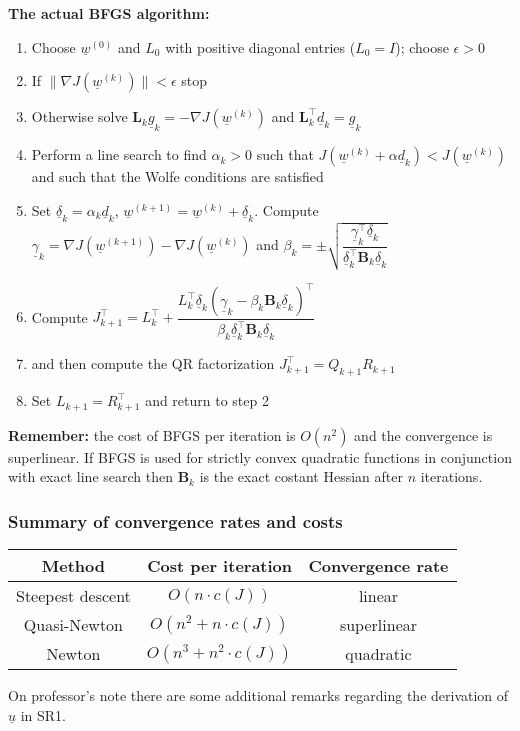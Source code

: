 \textbf{The actual BFGS algorithm:}
\begin{enumerate}
    \item Choose $\underline{w}^{(0)}$ and $L_0$ with positive diagonal entries ($L_0 = I$); choose $\epsilon > 0$
    \item If $\|\nabla J(\underline{w}^{(k)})\| < \epsilon$ stop
    \item Otherwise solve $\mathbf{L}_k \underline{g}_k = - \nabla J(\underline{w}^{(k)})$ and $\mathbf{L}_k^\intercal \underline{d}_k = \underline{g}_k$
    \item Perform a line search to find $\alpha_k > 0$ such that $J(\underline{w}^{(k)} +  \alpha\underline{d}_k) < J(\underline{w}^{(k)})$ and such that the Wolfe conditions are satisfied
    \item Set $\underline{\delta}_k = \alpha_k \underline{d}_k$, $\underline{w}^{(k+1)} = \underline{w}^{(k)} + \underline{\delta}_k$. Compute $\underline{\gamma}_k = \nabla J(\underline{w}^{(k+1)}) - \nabla J(\underline{w}^{(k)})$ and $\beta_k = \pm \sqrt{\dfrac{\underline{\gamma}_k^\intercal\underline{\delta}_k}{\underline{\delta}_k^\intercal \mathbf{B}_k \underline{\delta}_k}}$
    \item Compute $J_{k+1}^\intercal = L_k^\intercal + \dfrac{L_k^\intercal \underline{\delta}_k (\underline{\gamma}_k - \beta_k \mathbf{B}_k \underline{\delta}_k)^\intercal}{\beta_k \underline{\delta}_k^\intercal \mathbf{B}_k \underline{\delta}_k}$ 
    \item and then compute the QR factorization $J_{k+1}^\intercal = Q_{k+1}R_{k+1}$ 
    \item Set $L_{k+1} = R_{k+1}^\intercal$ and return to step 2
\end{enumerate}

\textbf{Remember:} the cost of BFGS per iteration is $O(n^2)$ and the convergence is superlinear. If BFGS is used for strictly convex quadratic functions in conjunction with exact line search then $\mathbf{B}_k$ is the exact costant Hessian after $n$ iterations.\\

\subsubsection{Summary of convergence rates and costs}
\begin{center}
    \begin{tabular}{|c|c|c|}
        \hline
        \textbf{Method} & \textbf{Cost per iteration} & \textbf{Convergence rate}\\
        \hline
        Steepest descent & $O(n\cdot c(J))$ & linear\\
        \hline
        Quasi-Newton & $O(n^2 + n\cdot c(J))$ & superlinear\\
        \hline
        Newton & $O(n^3 + n^2\cdot c(J))$ & quadratic\\
        \hline
    \end{tabular}
\end{center}
On professor's note there are some additional remarks regarding the derivation of $\underline{u}$ in SR1.\\ 
